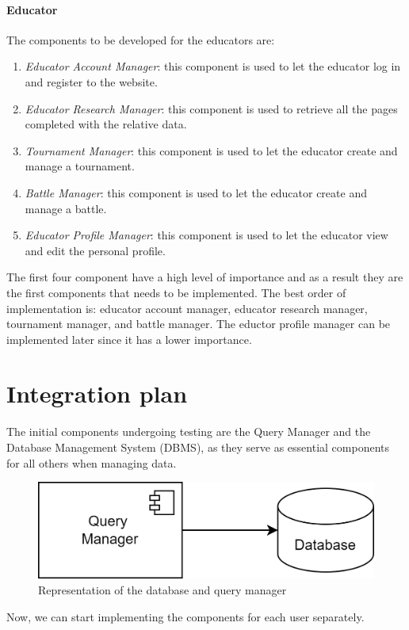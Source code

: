 \documentclass[12pt, a4paper]{report}
\begin{document}
    \paragraph*{Educator}
    The components to be developed for the educators are: 
    \begin{enumerate}
        \item \textit{Educator Account Manager}: this component is used to let the educator log in and register to the website. 
        \item \textit{Educator Research Manager}: this component is used to retrieve all the pages completed with the relative data. 
        \item \textit{Tournament Manager}: this component is used to let the educator create and manage a tournament.  
        \item \textit{Battle Manager}: this component is used to let the educator create and manage a battle.  
        \item \textit{Educator Profile Manager}: this component is used to let the educator view and edit the personal profile.
    \end{enumerate}
    The first four component have a high level of importance and as a result they are the first components that needs to be implemented. 
    The best order of implementation is: educator account manager, educator research manager, tournament manager, and battle manager. 
    The eductor profile manager can be implemented later since it has a lower importance. 

    \section{Integration plan}
    The initial components undergoing testing are the Query Manager and the Database Management System (DBMS), as they serve as essential components for all others when managing data.
    \begin{figure}[H]
        \centering
        \includegraphics[width=0.5\linewidth]{images/data.png}
        \caption{Representation of the database and query manager}
    \end{figure}
    Now, we can start implementing the components for each user separately. 
\end{document}

